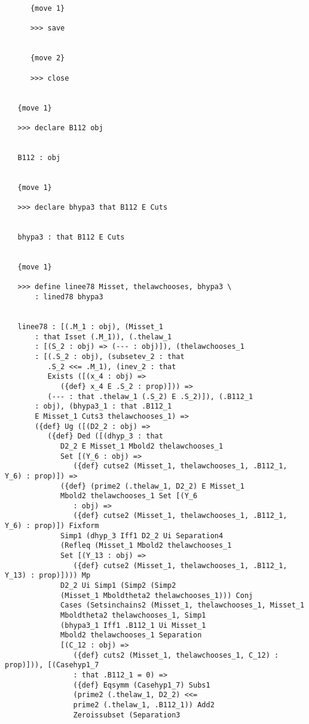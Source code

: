 \documentclass[12pt]{article}
\begin{document}
\begin{verbatim}
      {move 1}

      >>> save


      {move 2}

      >>> close


   {move 1}

   >>> declare B112 obj


   B112 : obj


   {move 1}

   >>> declare bhypa3 that B112 E Cuts


   bhypa3 : that B112 E Cuts


   {move 1}

   >>> define linee78 Misset, thelawchooses, bhypa3 \
       : lined78 bhypa3


   linee78 : [(.M_1 : obj), (Misset_1 
       : that Isset (.M_1)), (.thelaw_1 
       : [(S_2 : obj) => (--- : obj)]), (thelawchooses_1 
       : [(.S_2 : obj), (subsetev_2 : that 
          .S_2 <<= .M_1), (inev_2 : that 
          Exists ([(x_4 : obj) => 
             ({def} x_4 E .S_2 : prop)])) => 
          (--- : that .thelaw_1 (.S_2) E .S_2)]), (.B112_1 
       : obj), (bhypa3_1 : that .B112_1 
       E Misset_1 Cuts3 thelawchooses_1) => 
       ({def} Ug ([(D2_2 : obj) => 
          ({def} Ded ([(dhyp_3 : that 
             D2_2 E Misset_1 Mbold2 thelawchooses_1 
             Set [(Y_6 : obj) => 
                ({def} cutse2 (Misset_1, thelawchooses_1, .B112_1, Y_6) : prop)]) => 
             ({def} (prime2 (.thelaw_1, D2_2) E Misset_1 
             Mbold2 thelawchooses_1 Set [(Y_6 
                : obj) => 
                ({def} cutse2 (Misset_1, thelawchooses_1, .B112_1, Y_6) : prop)]) Fixform 
             Simp1 (dhyp_3 Iff1 D2_2 Ui Separation4 
             (Refleq (Misset_1 Mbold2 thelawchooses_1 
             Set [(Y_13 : obj) => 
                ({def} cutse2 (Misset_1, thelawchooses_1, .B112_1, Y_13) : prop)]))) Mp 
             D2_2 Ui Simp1 (Simp2 (Simp2 
             (Misset_1 Mboldtheta2 thelawchooses_1))) Conj 
             Cases (Setsinchains2 (Misset_1, thelawchooses_1, Misset_1 
             Mboldtheta2 thelawchooses_1, Simp1 
             (bhypa3_1 Iff1 .B112_1 Ui Misset_1 
             Mbold2 thelawchooses_1 Separation 
             [(C_12 : obj) => 
                ({def} cuts2 (Misset_1, thelawchooses_1, C_12) : prop)])), [(Casehyp1_7 
                : that .B112_1 = 0) => 
                ({def} Eqsymm (Casehyp1_7) Subs1 
                (prime2 (.thelaw_1, D2_2) <<= 
                prime2 (.thelaw_1, .B112_1)) Add2 
                Zeroissubset (Separation3 

\end{verbatim}
\end{document}
